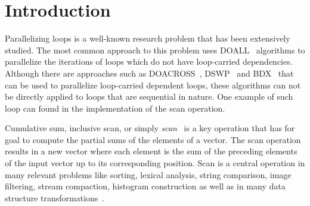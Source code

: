 \documentclass[Ingles]{ic-tese-v1}
\begin{document}


\listoffigures






\tableofcontents


\fimdaspaginasiniciais


\chapter{Introduction}
\label{cap:Introduction}

Parallelizing loops  is a  well-known research  problem that  has been
extensively  studied. The  most common  approach to  this problem  uses
DOALL~\cite{Lamport:1974} algorithms  to parallelize
the iterations of  loops which do not  have loop-carried dependencies.
Although  there  are   approaches  such  as  DOACROSS~\cite{doacross},
DSWP~\cite{Rangan:2004} and  BDX~\cite{Cesar:2015} that
can be  used to parallelize loop-carried dependent  loops, these algorithms
can  not  be  directly  applied   to  loops  that  are  sequential  in
nature. One  example of such loop  can found in the  implementation of
the scan operation.

Cumulative     sum,     inclusive     scan,     or     simply     {\it
	scan}~\cite{ScanAsPrimitive} is  a key operation that  has for goal
to compute  the partial  sums of  the elements of  a vector.  The scan
operation results in a new vector where each element is the sum of the
preceding  elements  of  the  input vector  up  to  its  corresponding
position. Scan is a central operation in many  relevant  problems  like  sorting,
lexical  analysis,  string comparison,  image  filtering, stream compaction,
histogram construction as well as  in many data
structure transformations~\cite{BlellochTR90}.
\end{document}
